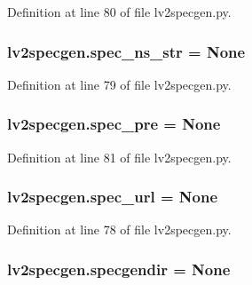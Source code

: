 Definition at line 80 of file lv2specgen.\+py.

\subsubsection[{\texorpdfstring{spec\+\_\+ns\+\_\+str}{spec_ns_str}}]{\setlength{\rightskip}{0pt plus 5cm}lv2specgen.\+spec\+\_\+ns\+\_\+str = None}\hypertarget{namespacelv2specgen_ad4f6c4129ec0c7ad9e6998a85b105947}{}\label{namespacelv2specgen_ad4f6c4129ec0c7ad9e6998a85b105947}


Definition at line 79 of file lv2specgen.\+py.

\subsubsection[{\texorpdfstring{spec\+\_\+pre}{spec_pre}}]{\setlength{\rightskip}{0pt plus 5cm}lv2specgen.\+spec\+\_\+pre = None}\hypertarget{namespacelv2specgen_ac7c2ed8bc47f19f1d9f9fa3c86fcc4b2}{}\label{namespacelv2specgen_ac7c2ed8bc47f19f1d9f9fa3c86fcc4b2}


Definition at line 81 of file lv2specgen.\+py.

\subsubsection[{\texorpdfstring{spec\+\_\+url}{spec_url}}]{\setlength{\rightskip}{0pt plus 5cm}lv2specgen.\+spec\+\_\+url = None}\hypertarget{namespacelv2specgen_a838306d5c00dc2ac98ccda45181f6e2a}{}\label{namespacelv2specgen_a838306d5c00dc2ac98ccda45181f6e2a}


Definition at line 78 of file lv2specgen.\+py.

\subsubsection[{\texorpdfstring{specgendir}{specgendir}}]{\setlength{\rightskip}{0pt plus 5cm}lv2specgen.\+specgendir = None}\hypertarget{namespacelv2specgen_afdc97650f3f4e8e3fda54aba8367abc6}{}\label{namespacelv2specgen_afdc97650f3f4e8e3fda54aba8367abc6}


